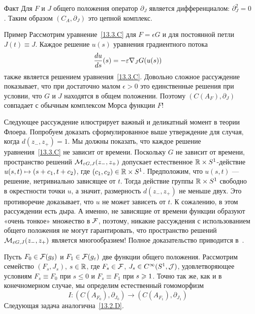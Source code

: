 \begin{thm}{Факт}\label{13.3.F}
  Для $F$ и $J$ общего положения оператор $\partial_{J}$ является
  дифференциалом: $\partial_{J}^{2}=0$.
  Таким образом $(C_{A},\partial_{J})$ это цепной комплекс.
\end{thm}

\begin{thm}{Пример}\label{13.3.G}
Рассмотрим уравнение~\ref{13.3.C} для $F = \epsilon G$ и для
  постоянной петли $J(t)\equiv J$.
  Каждое решение $u(s)$ уравнения градиентного потока
  \[
  \frac{d u}{d s} (s) = -\varepsilon\nabla_{J} G(u(s))
  \]
  также является решением уравнения~\ref{13.3.C}.
Довольно сложное рассуждение \cite[Lemma 7.1]{HS} показывает, что при
  достаточно малом $\epsilon>0$ это единственные решения при
  условии, что $G$ и $J$ находятся в общем положении.
  Поэтому $(C(A_{F}),\partial_{J})$ совпадает с обычным комплексом
  Морса функции $F$!
\end{thm}

Следующее рассуждение илюстрирует важный и деликатный
момент в теории Флоера.
Попробуем доказать сформулированное выше утверждение для случая, когда
$d(z_{-}, z_{+})=1$.  
Мы должны показать, что каждое решение уравнения~\ref{13.3.C} не
зависит от времени.
Поскольку $G$ не зависит от времени, пространство решений
$\mathcal{M}_{\varepsilon G,J}(z_{-},z_{+})$ допускает естественное $\mathbb{R}\times
S^{1}$-действие $u(s, t) \mapsto (s\z+c_{1},t+c_{2})$, где
$(c_{1},c_{2})\in\mathbb{R}\times S^{1}$.
Предположим, что $u(s, t)$ — решение, нетривиально зависящее от $t$.
Тогда действие группы $\mathbb{R}\times S^{1}$ свободно в окрестности точки $u$,
а значит, размерность $d(z_{-}, z_{+})$ не меньше двух.
Это противоречие доказывает, что $u$ не может зависеть от $t$.
К сожалению, в этом рассуждении есть дыра.
А именно, не зависящие от времени функции образуют «очень тонкое» множество в $\mathcal{F}$, поэтому, никакие рассуждения с использованием общего положения не могут гарантировать, что пространство решений $\mathcal{M}_{\varepsilon G,J}(z_{-}, z_{+})$ является многообразием!
Полное доказательство приводится в~\cite{HS}.

Пусть $F_{0}\in\mathcal{F}(g_{\delta})$ и $F_{1}\in\mathcal{F}(g_{\varepsilon})$ две
функции общего положения. 
Рассмотрим семейство $(F_{s}, J_{s})$, $s\in\mathbb{R}$, где
$F_{s}\in\mathcal{F}$, $J_{s}\in C^{\infty}(S^{1},\mathcal{J})$, удовлетворяющее
условиям 
$F_{s}\equiv F_{0}$ при $s\le0$ и $F_{s}\equiv F_{1}$ при $s\z\ge1$.
Точно так же, как и в конечномерном случае, мы определим
естественный гомоморфизм
\[
I:(C(A_{F_{0}}),\partial_{J_{0}})\to(C(A_{F_{1}}),\partial_{J_{1}})
\]
Следующая задача аналогична~\ref{13.2.D}.

